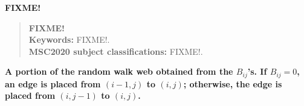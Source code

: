\documentclass{article}
\begin{document}
\begin{center}
    \textbf{FIXME!}
\end{center}

\begin{abstract}
    \textbf{FIXME!} \\
    
    \textbf{Keywords:} FIXME!. \\
    \textbf{MSC2020 subject classifications:} FIXME!.
\end{abstract}

\begin{center}
    \textbf{A portion of the random walk web obtained from the $B_{ij}$'s. If $B_{ij}=0$, an edge is placed from $(i-1,j)$ to $(i,j)$; otherwise, the edge is placed from $(i,j-1)$ to $(i,j)$.}
\end{center}
\end{document}
